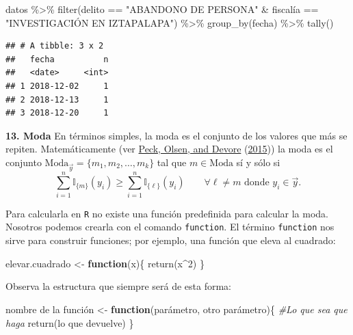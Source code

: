 \documentclass[
]{book}
\newenvironment{Shaded}{\begin{snugshade}}{\end{snugshade}}
\newcommand{\CommentTok}[1]{\textcolor[rgb]{0.56,0.35,0.01}{\textit{#1}}}
\newcommand{\ControlFlowTok}[1]{\textcolor[rgb]{0.13,0.29,0.53}{\textbf{#1}}}
\newcommand{\DecValTok}[1]{\textcolor[rgb]{0.00,0.00,0.81}{#1}}
\newcommand{\FunctionTok}[1]{\textcolor[rgb]{0.00,0.00,0.00}{#1}}
\newcommand{\NormalTok}[1]{#1}
\newcommand{\OtherTok}[1]{\textcolor[rgb]{0.56,0.35,0.01}{#1}}
\newcommand{\SpecialCharTok}[1]{\textcolor[rgb]{0.00,0.00,0.00}{#1}}
\newcommand{\StringTok}[1]{\textcolor[rgb]{0.31,0.60,0.02}{#1}}
\begin{document}
\begin{Shaded}
\begin{Highlighting}[]
\NormalTok{datos }\SpecialCharTok{\%\textgreater{}\%} 
  \FunctionTok{filter}\NormalTok{(delito }\SpecialCharTok{==} \StringTok{"ABANDONO DE PERSONA"} \SpecialCharTok{\&} 
\NormalTok{           fiscalía }\SpecialCharTok{==} \StringTok{"INVESTIGACIÓN EN IZTAPALAPA"}\NormalTok{) }\SpecialCharTok{\%\textgreater{}\%}
  \FunctionTok{group\_by}\NormalTok{(fecha) }\SpecialCharTok{\%\textgreater{}\%}  \FunctionTok{tally}\NormalTok{()}
\end{Highlighting}
\end{Shaded}

\begin{verbatim}
## # A tibble: 3 x 2
##   fecha          n
##   <date>     <int>
## 1 2018-12-02     1
## 2 2018-12-13     1
## 3 2018-12-20     1
\end{verbatim}

\textbf{13. Moda}
En términos simples, la moda es el conjunto de los valores que más se repiten. Matemáticamente (ver \protect\hyperlink{ref-peck2015introduction}{Peck, Olsen, and Devore} (\protect\hyperlink{ref-peck2015introduction}{2015})) la moda es el conjunto \(\textrm{Moda}_{\vec{y}} = \{ m_1, m_2, \dots, m_k \}\) tal que \(m \in \textrm{Moda}\) sí y sólo si
\[
\sum_{i = 1}^{n} \mathbb{I}_{\{m\}}(y_i) \geq \sum_{i = 1}^{n} \mathbb{I}_{\{ \ell\}}(y_i) \qquad \forall \ell \neq m \textrm{ donde } y_i \in \vec{y}.
\]

Para calcularla en \texttt{R} no existe una función predefinida para calcular la moda. Nosotros podemos crearla con el comando \texttt{function}. El término \texttt{function} nos sirve para construir funciones; por ejemplo, una función que eleva al cuadrado:

\begin{Shaded}
\begin{Highlighting}[]
\NormalTok{elevar.cuadrado }\OtherTok{\textless{}{-}} \ControlFlowTok{function}\NormalTok{(x)\{}
  \FunctionTok{return}\NormalTok{(x}\SpecialCharTok{\^{}}\DecValTok{2}\NormalTok{)}
\NormalTok{\}}
\end{Highlighting}
\end{Shaded}

Observa la estructura que siempre será de esta forma:

\begin{Shaded}
\begin{Highlighting}[]
\NormalTok{nombre de la función }\OtherTok{\textless{}{-}} \ControlFlowTok{function}\NormalTok{(parámetro, otro parámetro)\{}
  \CommentTok{\#Lo que sea que haga}
  \FunctionTok{return}\NormalTok{(lo que devuelve)}
\NormalTok{\}}
\end{Highlighting}
\end{Shaded}
\end{document}
